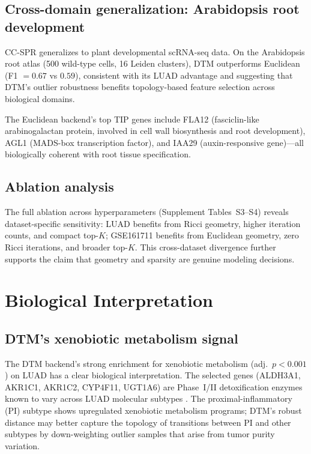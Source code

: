 \documentclass[11pt]{article}
\begin{document}
\subsection{Cross-domain generalization: Arabidopsis root development}

CC-SPR generalizes to plant developmental scRNA-seq data.
On the Arabidopsis root atlas (500 wild-type cells, 16 Leiden clusters), DTM outperforms Euclidean (F1 $= 0.67$ vs $0.59$), consistent with its LUAD advantage and suggesting that DTM's outlier robustness benefits topology-based feature selection across biological domains.

The Euclidean backend's top TIP genes include FLA12 (fasciclin-like arabinogalactan protein, involved in cell wall biosynthesis and root development), AGL1 (MADS-box transcription factor), and IAA29 (auxin-responsive gene)---all biologically coherent with root tissue specification.


\subsection{Ablation analysis}

The full ablation across hyperparameters (Supplement Tables~S3--S4) reveals dataset-specific sensitivity:
LUAD benefits from Ricci geometry, higher iteration counts, and compact top-$K$;
GSE161711 benefits from Euclidean geometry, zero Ricci iterations, and broader top-$K$.
This cross-dataset divergence further supports the claim that geometry and sparsity are genuine modeling decisions.

\section{Biological Interpretation}
\label{sec:biology}

\subsection{DTM's xenobiotic metabolism signal}

The DTM backend's strong enrichment for xenobiotic metabolism (adj.\ $p < 0.001$) on LUAD has a clear biological interpretation.
The selected genes (ALDH3A1, AKR1C1, AKR1C2, CYP4F11, UGT1A6) are Phase~I/II detoxification enzymes known to vary across LUAD molecular subtypes \cite{rizvi2017}.
The proximal-inflammatory (PI) subtype shows upregulated xenobiotic metabolism programs; DTM's robust distance may better capture the topology of transitions between PI and other subtypes by down-weighting outlier samples that arise from tumor purity variation.
\end{document}
